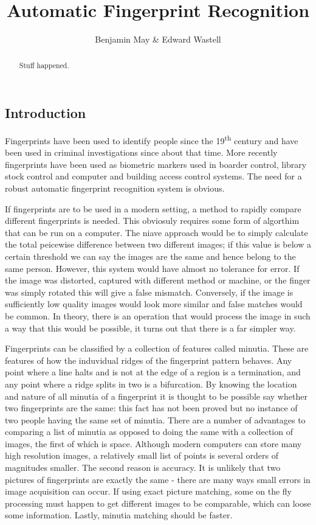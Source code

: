 \documentclass[11pt,a4paper]{article}
\title{Automatic Fingerprint Recognition}
\author{Benjamin May \& Edward Wastell}
\begin{document}
    \maketitle

    \begin{abstract}
      Stuff happened.
    \end{abstract}

    \begin{multicols}{2}

\section{Introduction}
	Fingerprints have been used to identify people since the 19\textsuperscript{th} century and have been used in criminal investigations since about that time. More recently fingerprints have been used as biometric markers used in boarder control, library stock control and computer and building access control systems. The need for a robust automatic fingerprint recognition system is obvious.

        If fingerprints are to be used in a modern setting, a method to rapidly compare different fingerprints is needed. This obviosuly requires some form of algorthim that can be run on a computer. The niave approach would be to simply calculate the total peicewise difference between two different images; if this value is below a certain threshold we can say the images are the same and hence belong to the same person. However, this system would have almost no tolerance for error. If the image was distorted, captured with different method or machine, or the finger was simply rotated this will give a false mismatch. Conversely, if the image is sufficiently low quality images would look more similar and false matches would be common. In theory, there is an operation that would process the image in such a way that this would be possible, it turns out that there is a far simpler way.

        Fingerprints can be classified by a collection of features called minutia. These are features of how the induvidual ridges of the fingerprint pattern behaves. Any point where a line halts and is not at the edge of a region is a termination, and any point where a ridge splits in two is a bifurcation. By knowing the location and nature of all minutia of a fingerprint it is thought to be possible say whether two fingerprints are the same: this fact has not been proved but no instance of two people having the same set of minutia. There are a number of advantages to comparing a list of minutia as opposed to doing the same with a collection of images, the first of which is space. Although modern computers can store many high resolution images, a relatively small list of points is several orders of magnitudes smaller. The second reason is accuracy. It is unlikely that two pictures of fingerprints are exactly the same - there are many ways small errors in image acquisition can occur. If using exact picture matching, some on the fly processing must happen to get different images to be comparable, which can loose some information. Lastly, minutia matching should be faster.



\end{multicols}
\end{document}
